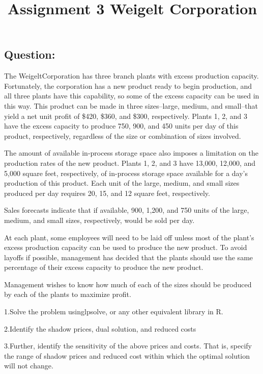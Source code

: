 \documentclass[
]{article}
\title{Assignment 3 Weigelt Corporation}
\author{}
\date{\vspace{-2.5em}}
\begin{document}
\maketitle

\hypertarget{question}{%
\subsection{Question:}\label{question}}

The WeigeltCorporation has three branch plants with excess production
capacity. Fortunately, the corporation has a new product ready to begin
production, and all three plants have this capability, so some of the
excess capacity can be used in this way. This product can be made in
three sizes--large, medium, and small--that yield a net unit profit of
\$420, \$360, and \$300, respectively. Plants 1, 2, and 3 have the
excess capacity to produce 750, 900, and 450 units per day of this
product, respectively, regardless of the size or combination of sizes
involved.

The amount of available in-process storage space also imposes a
limitation on the production rates of the new product. Plants 1, 2, and
3 have 13,000, 12,000, and 5,000 square feet, respectively, of
in-process storage space available for a day's production of this
product. Each unit of the large, medium, and small sizes produced per
day requires 20, 15, and 12 square feet, respectively.

Sales forecasts indicate that if available, 900, 1,200, and 750 units of
the large, medium, and small sizes, respectively, would be sold per day.

At each plant, some employees will need to be laid off unless most of
the plant's excess production capacity can be used to produce the new
product. To avoid layoffs if possible, management has decided that the
plants should use the same percentage of their excess capacity to
produce the new product.

Management wishes to know how much of each of the sizes should be
produced by each of the plants to maximize profit.

1.Solve the problem usinglpsolve, or any other equivalent library in R.

2.Identify the shadow prices, dual solution, and reduced costs

3.Further, identify the sensitivity of the above prices and costs. That
is, specify the range of shadow prices and reduced cost within which the
optimal solution will not change.
\end{document}
